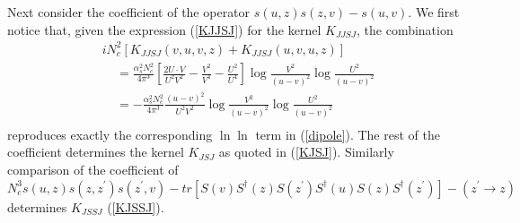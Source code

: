\documentclass[11pt,a4paper]{article}
\begin{document}
Next consider the coefficient of the operator $s(u,z)s(z,v)-s(u,v)$. We first notice that,  given the expression  (\ref{KJJSJ}) for the kernel $K_{JJSJ}$, the combination 
\begin{equation}\begin{split}\label{loglog}
&iN_{c}^{2}\left[K_{JJSJ}(v,u,v,z)+K_{JJSJ}(u,v,u,z)\right]\\
&\ \ \ \ \ =\frac{\alpha_{s}^{2}N_{c}^{2}}{4\pi^{3}}\left[\frac{2U\cdot V}{U^{2}V^{2}}-\frac{V^{2}}{V^{4}}-\frac{U^{2}}{U^{4}}\right]\log\frac{V^{2}}{(u-v)^{2}}\log\frac{U^{2}}{(u-v)^{2}}\\
&\ \ \ \ \  =-\frac{\alpha_{s}^{2}N_{c}^{2}}{4\pi^{3}}\frac{(u-v)^{2}}{U^{2}V^{2}}\log\frac{V^{2}}{(u-v)^{2}}\log\frac{U^{2}}{(u-v)^{2}}\\
\end{split}\end{equation}
reproduces exactly the corresponding $\ln\ln$ term in (\ref{dipole}). The rest of the coefficient determines the kernel $K_{JSJ}$ as quoted in (\ref{KJSJ}).
Similarly comparison of the coefficient of\\  $N_{c}^{3}s(u,z)s(z,z^{\prime})s(z^{\prime},v)-tr\left[S(v)S^{\dagger}(z)S(z^{\prime})S^{\dagger}(u)S(z)S^{\dagger}(z^{\prime})\right]-(z^{\prime}\rightarrow z)$ determines $K_{JSSJ}$ (\ref{KJSSJ}).
\end{document}
